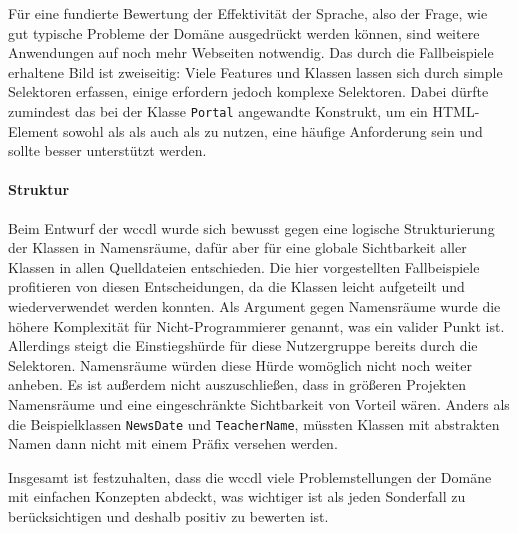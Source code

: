     Für eine fundierte Bewertung der Effektivität der Sprache,
    also der Frage, wie gut typische Probleme der Domäne ausgedrückt werden können,
    sind weitere Anwendungen auf noch mehr Webseiten notwendig.
    Das durch die Fallbeispiele erhaltene Bild ist zweiseitig:
    Viele Features und Klassen lassen sich durch simple Selektoren erfassen,
    einige erfordern jedoch komplexe Selektoren.
    Dabei dürfte zumindest das bei der Klasse \texttt{Portal} angewandte Konstrukt,
    um ein HTML-Element sowohl als {\contentFeature} als auch als {} zu nutzen,
    eine häufige Anforderung sein und sollte besser unterstützt werden.

    \paragraph{Struktur}
    Beim Entwurf der \gls{wccdl} wurde sich bewusst gegen
    eine logische Strukturierung der Klassen in Namensräume,
    dafür aber für eine globale Sichtbarkeit aller Klassen
    in allen Quelldateien entschieden.
    Die hier vorgestellten Fallbeispiele profitieren von diesen Entscheidungen,
    da die Klassen leicht aufgeteilt und wiederverwendet werden konnten.
    Als Argument gegen Namensräume wurde die höhere Komplexität für
    Nicht-Programmierer genannt, was ein valider Punkt ist.
    Allerdings steigt die Einstiegshürde für diese Nutzergruppe bereits
    durch die Selektoren. Namensräume würden diese Hürde womöglich nicht noch weiter anheben.
    Es ist außerdem nicht auszuschließen, dass in größeren Projekten
    Namensräume und eine eingeschränkte Sichtbarkeit von Vorteil wären.
    Anders als die Beispielklassen \texttt{NewsDate} und \texttt{TeacherName},
    müssten Klassen mit abstrakten Namen dann nicht mit einem Präfix versehen werden.

    Insgesamt ist festzuhalten, dass die \gls{wccdl} viele Problemstellungen der Domäne
    mit einfachen Konzepten abdeckt, was wichtiger ist als jeden Sonderfall zu berücksichtigen
    und deshalb positiv zu bewerten ist.